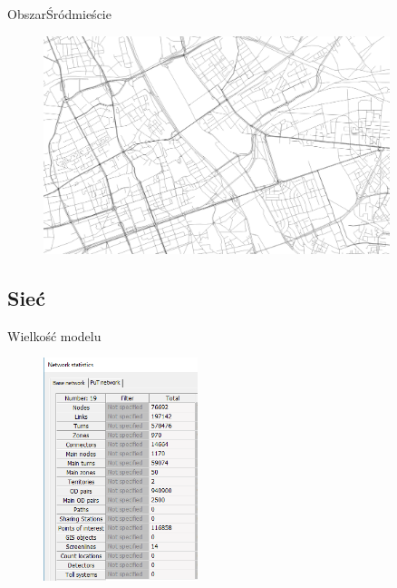 \documentclass[8pt]{beamer}
\begin{document}
\begin{frame}{Obszar}{Śródmieście}
\begin{figure}
\begin{center}
\includegraphics[width=0.9\textwidth]{n5}
 \end{center}
  \end{figure} 
\end{frame}

\subsection{Sieć}
\begin{frame}{Wielkość modelu}{}
\begin{figure}\begin{center}
\includegraphics[width=0.4\textwidth]{size}
 \end{center}  \end{figure} 
\end{frame}
\end{document}
